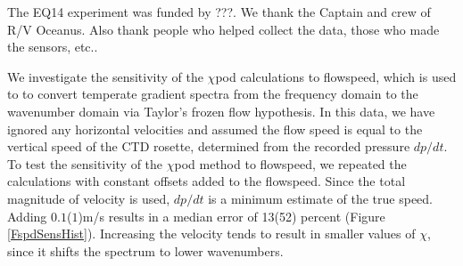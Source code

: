 \documentclass{ametsoc}
\begin{document}
%
\acknowledgments
The EQ14 experiment was funded by ???. We thank the Captain and crew of R/V Oceanus. Also thank people who helped collect the data, those who made the sensors, etc..


%


%


\appendix[A]


We investigate the sensitivity of the $\chi$pod calculations to flowspeed, which is used to to convert 	temperate gradient spectra from the frequency domain to the wavenumber domain via Taylor's frozen flow hypothesis. In this data, we have ignored any horizontal velocities and assumed the flow speed is equal to the vertical speed of the CTD rosette, determined from the recorded pressure $dp/dt$. To test the sensitivity of the $\chi$pod method to flowspeed, we repeated the calculations with constant offsets added to the flowspeed. Since the total magnitude of velocity is used, $dp/dt$ is a minimum estimate of the true speed. Adding $0.1$($1$)m/s results in a median error of 13(52) percent (Figure \ref{FspdSensHist}). Increasing the velocity tends to result in smaller values of $\chi$, since it shifts the spectrum to lower wavenumbers. 


\appendix[B]
\end{document}
